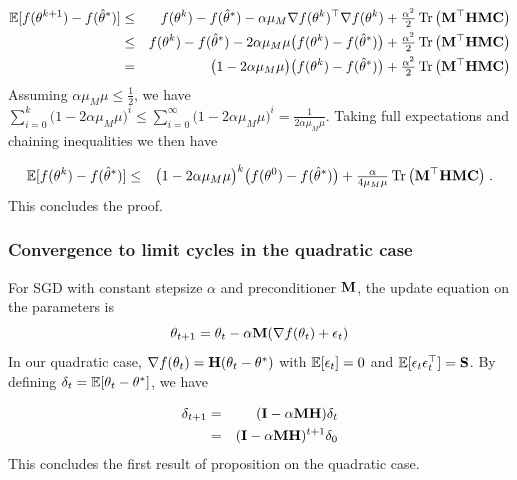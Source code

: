\begin{eqnarray*}
\mathbb{E} [ f(\theta^{k+1}) - f(\hat\theta^\ast)] &\le&  f(\theta^{k}) - f(\hat\theta^\ast) -\alpha \mu_M \nabla f(\theta^{k})^\top \nabla f(\theta^{k}) + \tfrac{\alpha^2}{2} \operatorname{Tr} \big({\mathbf{M}}^\top {\mathbf{H}} {\mathbf{M}} {\mathbf{C}} \big)  \\
&\le& f(\theta^{k}) - f(\hat\theta^\ast) -2 \alpha \mu_M \mu  \big( f(\theta^{k}) - f(\hat\theta^\ast)\big)  + \tfrac{\alpha^2}{2} \operatorname{Tr} \big({\mathbf{M}}^\top {\mathbf{H}} {\mathbf{M}} {\mathbf{C}} \big)  \\
&=& \big(1 -2 \alpha \mu_M \mu\big)  \big( f(\theta^{k}) - f(\hat\theta^\ast)\big)  + \tfrac{\alpha^2}{2} \operatorname{Tr} \big({\mathbf{M}}^\top {\mathbf{H}} {\mathbf{M}} {\mathbf{C}} \big)  \\
\end{eqnarray*}
Assuming $ \alpha \mu_M \mu \le \frac{1}{2}$, we have $\sum_{i=0}^k \big(1 -2 \alpha \mu_M \mu\big)^i \le \sum_{i=0}^\infty \big(1 -2 \alpha \mu_M \mu\big)^i = \frac{1}{2 \alpha \mu_M \mu} $. Taking full expectations and chaining inequalities we then have

\begin{eqnarray*}
\mathbb{E} [ f(\theta^{k}) - f(\hat\theta^\ast)] &\le& \big(1 -2 \alpha \mu_M \mu\big)^k  \big( f(\theta^{0}) - f(\hat\theta^\ast)\big)  + \tfrac{\alpha}{4 \mu_M \mu} \operatorname{Tr} \big({\mathbf{M}}^\top {\mathbf{H}} {\mathbf{M}} {\mathbf{C}} \big)  \; .
\end{eqnarray*}
This concludes the proof.

\subsubsection{Convergence to limit cycles in the quadratic case}
\label{proof:quadratic}
For SGD with constant stepsize $\alpha$ and preconditioner ${\mathbf{M}}$, the update equation on the parameters is 
$$\theta_{t+1} = \theta_t - \alpha {\mathbf{M}} (\nabla f(\theta_t) + \epsilon_t) $$
In our quadratic case, $\nabla f(\theta_t) = {\mathbf{H}} (\theta_t - \theta^\ast)$ with $\mathbb{E} [\epsilon_t] = 0$ and $\mathbb{E} [\epsilon_t \epsilon_t^\top] = {\mathbf{S}}$. By defining $\delta_t = \mathbb{E} [\theta_t - \theta^\ast]$, we have

\begin{eqnarray*}
    \delta_{t+1} &=& ({\mathbf{I}} - \alpha {\mathbf{M}} {\mathbf{H}}) \delta_t \\
     &=&  ({\mathbf{I}} - \alpha {\mathbf{M}} {\mathbf{H}})^{t+1} \delta_0
\end{eqnarray*}
This concludes the first result of proposition on the quadratic case.

